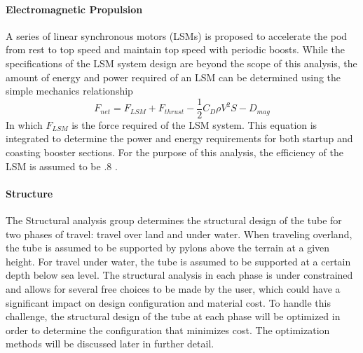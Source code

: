 \paragraph{Electromagnetic Propulsion}
	A series of linear synchronous motors (LSMs) is proposed to accelerate the
	pod from rest to top speed and maintain top speed with periodic boosts.
	While the specifications of the LSM system design are beyond the scope of
	this analysis, the amount of energy and power required of an LSM can be
	determined using the simple mechanics relationship
	\begin{equation}
		\label{eq:sum_of_forces}
		F_{net} = F_{LSM} + F_{thrust} - \frac{1}{2}C_{D}\rho V^{2}S - D_{mag}
	\end{equation}
	In which $F_{LSM}$ is the force required of the LSM system. This equation
	is integrated to determine the power and energy requirements for both
	startup and coasting booster sections. For the purpose of this analysis,
	the efficiency of the LSM is assumed to be .8 \cite{LSM}.
\paragraph{Structure}
	The Structural analysis group determines the structural design of the tube
	for two phases of travel: travel over land and under water. When traveling
	overland, the tube is assumed to be supported by pylons above the terrain
	at a given height. For travel under water, the tube is assumed to be
	supported at a certain depth below sea level. The structural analysis in
	each phase is under constrained and allows for several free choices to be
	made by the user, which could have a significant impact on design
	configuration and material cost. To handle this challenge, the structural
	design of the tube at each phase will be optimized in order to determine
	the configuration that minimizes cost. The optimization methods will be
	discussed later in further detail.

